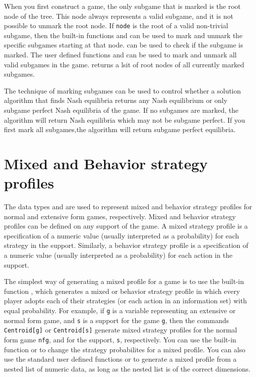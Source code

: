 When you first construct a game, the only subgame that is marked is
the root node of the tree.  This node always represents a valid
subgame, and it is not possible to unmark the root node.  If
\verb+node+ is the root of a valid non-trivial subgame, then the
built-in functions  and  can be
used to mark and unmark the specific subgames starting at that node.
 can be used to check if the subgame is marked.
The user defined functions  and
 can be used to mark and unmark all valid
subgames in the game.   returns a lsit of root
nodes of all currently marked subgames.

The technique of marking subgames can be used to control whether a
solution algorithm that finds Nash equilibria returns any Nash
equilibrium or only subgame perfect Nash equilibria of the game.  If
no subgames are marked, the algorithm will return Nash equilibria
which may not be subgame perfect.  If you first mark all subgames,the
algorithm will return subgame perfect equilibria.

\section{Mixed and Behavior strategy profiles}

The data types  and  are used to represent
mixed and behavior strategy profiles for normal and extensive form
games, respectively.  Mixed and behavior strategy profiles can be
defined on any support of the game.  A mixed strategy profile is a
specification of a numeric value (usually interpreted as a
probability) for each strategy in the support.  Similarly, a behavior
strategy profile is a specification of a numeric value (usually
interpreted as a probability) for each action in the support.

The simplest way of generating a mixed profile for a game is to use
the built-in function , which generates a mixed or
behavior strategy profile in which every player adopts each of their
strategies (or each action in an information set) with equal
probability.  For example, if \verb+g+ is a variable representing an
extensive or normal form game, and \verb+s+ is a support for the game
\verb+g+, then the commands \verb+Centroid[g]+ or \verb+Centroid[s]+
generate mixed strategy profiles for the normal form game \verb+nfg+,
and for the support, \verb+s+, respectively.  You can use the built-in
function  or  to change
the strategy probabilites for a mixed profile.  You can also use the
standard user defined functions  or  to
generate a mixed profile from a nested list of numeric data, as long
as the nested list is of the correct dimensions.

